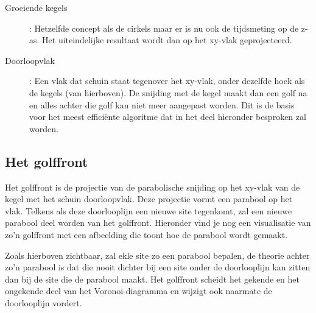\documentclass[12pt,a4paper]{article}
\begin{document}
\begin{description}
\begin{figure}[h]
			\label{fig:groeiende-cirkels-voorbeeld}
		\end{figure}
		\item[Groeiende kegels]: Hetzelfde concept als de cirkels maar er is nu ook de tijdsmeting op de z-as. Het uiteindelijke resultaat wordt dan op het xy-vlak geprojecteerd. 
		\item[Doorloopvlak]: Een vlak dat schuin staat tegenover het xy-vlak, onder dezelfde hoek als de kegels (van hierboven). De snijding met de kegel maakt dan een golf na en alles achter die golf kan niet meer aangepast worden. Dit is de basis voor het meest efficiënte algoritme dat in het deel hieronder besproken zal worden. 
	\end{description}
	
	
	\subsection{Het golffront}
	Het golffront is de projectie van de parabolische snijding op het xy-vlak van de kegel met het schuin doorloopvlak. Deze projectie vormt een parabool op het vlak. Telkens als deze doorlooplijn een nieuwe site tegenkomt, zal een nieuwe parabool deel worden van het golffront. Hieronder vind je nog een visualisatie van zo'n golffront met een afbeelding die toont hoe de parabool wordt gemaakt. 
	\begin{figure}[H]
		\centering
		\label{fig:golffrront-parabool}
	\end{figure}
	
	Zoals hierboven zichtbaar, zal ekle site zo een parabool bepalen, de theorie achter zo'n parabool is dat die nooit dichter bij een site onder de doorlooplijn kan zitten dan bij de site die de parabool maakt. Het golffront scheidt het gekende en het ongekende deel van het Voronoi-diagramma en wijzigt ook naarmate de doorlooplijn vordert. 
	
\end{document}
